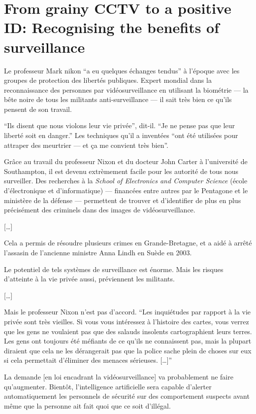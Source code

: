 \section{From grainy CCTV to a positive ID: Recognising the benefits of surveillance}

Le professeur Mark nikon \enquote{a eu quelques échanges tendus} à l'époque avec les groupes de protection des libertés publiques. Expert mondial dans la reconnaissance des personnes par vidéosurveillance en utilisant la biométrie --- la bête noire de tous les militants anti-surveillance --- il sait très bien ce qu'ils pensent de son travail.

\enquote{Ils disent que nous violons leur vie privée}, dit-il. \enquote{Je ne pense pas que leur liberté soit en danger.} Les techniques qu'il a inventées \enquote{ont été utilisées pour attraper des meurtrier --- et ça me convient très bien}.

Grâce au travail du professeur Nixon et du docteur John Carter à l'université de Southampton, il est devenu extrèmement facile pour les autorité de tous nous surveiller. Des recherches à la \emph{School of Electronics and Computer Science} (école d'électronique et d'informatique) --- financées entre autres par le Pentagone et le ministère de la défense --- permettent de trouver et d'identifier de plus en plus précisément des criminels dans des images de vidéosurveillance.

[…]

Cela a permis de résoudre plusieurs crimes en Grande-Bretagne, et a aidé à arrêté l'assasin de l'ancienne ministre Anna Lindh en Suède en 2003.

Le potentiel de tels systèmes de surveillance est énorme. Mais les risques d'atteinte à la vie privée aussi, préviennent les militants.

[…]

Mais le professeur Nixon n'est pas d'accord. \enquote{Les inquiétudes par rapport à la vie privée sont très vieilles. Si vous vous intéressez à l'histoire des cartes, vous verrez que les gens ne voulaient pas que des salauds insolents cartographient leurs terres. Les gens ont toujours été méfiants de ce qu'ils ne connaissent pas, mais la plupart diraient que cela ne les dérangerait pas que la police sache plein de choses sur eux si cela permettait d'éliminer des menaces sérieuses. […]}

La demande [en loi encadrant la vidéosurveillance] va probablement ne faire qu'augmenter. Bientôt, l'intelligence artificielle sera capable d'alerter automatiquement les personnels de sécurité sur des comportement suspects avant même que la personne ait fait quoi que ce soit d'illégal.
